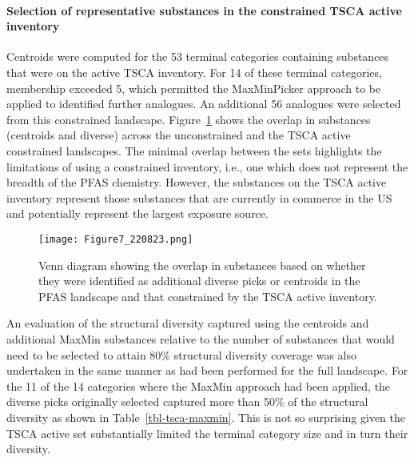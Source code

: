 \documentclass[
  super,
  preprint,
  3p]{elsarticle}
\let\oldparagraph\paragraph
\renewcommand{\paragraph}[1]{\oldparagraph{#1}\mbox{}}
\begin{document}
\hypertarget{sec-maxmin-tsca}{%
\paragraph{Selection of representative substances in the constrained
TSCA active inventory}\label{sec-maxmin-tsca}}

Centroids were computed for the 53 terminal categories containing
substances that were on the active TSCA inventory. For 14 of these
terminal categories, membership exceeded 5, which permitted the
MaxMinPicker approach to be applied to identified further analogues. An
additional 56 analogues were selected from this constrained landscape.
Figure~\ref{fig-venn} shows the overlap in substances (centroids and
diverse) across the unconstrained and the TSCA active constrained
landscapes. The minimal overlap between the sets highlights the
limitations of using a constrained inventory, i.e., one which does not
represent the breadth of the PFAS chemistry. However, the substances on
the TSCA active inventory represent those substances that are currently
in commerce in the US and potentially represent the largest exposure
source.

\begin{figure}

{\centering \texttt{[image: Figure7\_220823.png]}

}

\caption{\label{fig-venn}Venn diagram showing the overlap in substances
based on whether they were identified as additional diverse picks or
centroids in the PFAS landscape and that constrained by the TSCA active
inventory.}

\end{figure}

An evaluation of the structural diversity captured using the centroids
and additional MaxMin substances relative to the number of substances
that would need to be selected to attain 80\% structural diversity
coverage was also undertaken in the same manner as had been performed
for the full landscape. For the 11 of the 14 categories where the MaxMin
approach had been applied, the diverse picks originally selected
captured more than 50\% of the structural diversity as shown in
Table~\ref{tbl-tsca-maxmin}. This is not so surprising given the TSCA
active set substantially limited the terminal category size and in turn
their diversity.
\end{document}
